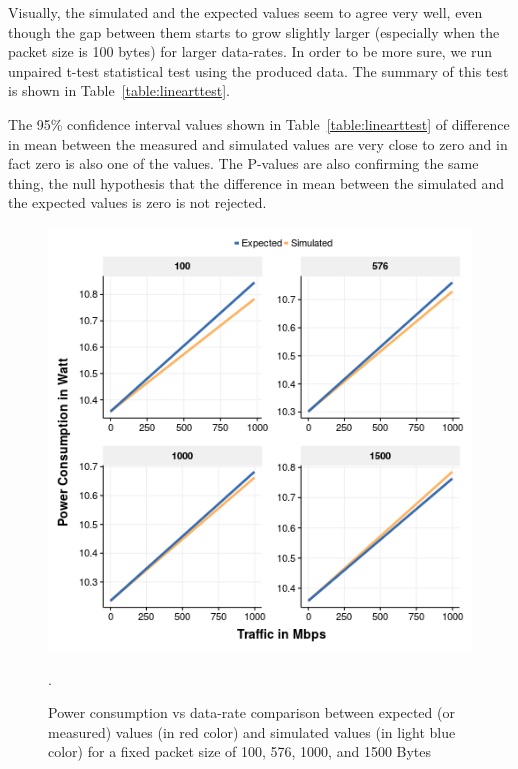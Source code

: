 Visually, the simulated and the expected values seem to agree very well, even though the gap between them starts to grow slightly larger (especially when the packet size is 100 bytes) for larger data-rates. In order to be more sure, we run unpaired t-test statistical test using the produced data. The summary of this test is shown in Table~\ref{table:linearttest}. 

The 95\% confidence interval values shown in Table~\ref{table:linearttest} of difference in mean between the measured and simulated values are very close to zero and in fact zero is also one of the values. The P-values are also confirming the same thing, the null hypothesis that the difference in mean between the simulated and the expected values is zero is not rejected. 
\begin{figure}[ht]
	\begin{center}
		\includegraphics[width=13cm]{images/expectedvssimulatedlinear.png}
		\caption{Power consumption vs data-rate comparison between expected (or measured) values (in red color) and simulated values (in light blue color) for a fixed packet size of 100, 576, 1000, and 1500 Bytes}.
		\label{fig:linear}
	\end{center}
\end{figure}
